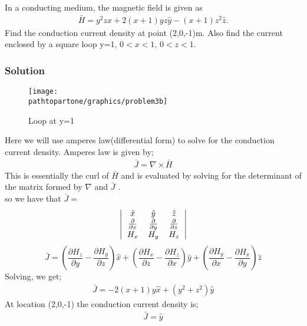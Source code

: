 \begin{exmp}
In a conducting medium, the magnetic field is given as
\begin{align*}
\bar{H}=y^{2}z\hat{x}+2(x+1)yz\hat{y}-(x+1)z^{2}\hat{z}.
\end{align*}
Find the conduction current density at point (2,0,-1)m. Also find the current enclosed by a square loop y=1, $0<x<1$, $0<z<1$.
\subsubsection*{Solution}
\begin{figure}[h]
\centering
\texttt{[image: \\pathtopartone/graphics/problem3b]}
\caption{Loop at y=1}
\end{figure} 

Here we will use amperes law(differential form) to solve for the conduction current density. Amperes law is given by;
\begin{align*}
\bar{J}=\nabla\times\bar{H}
\end{align*}
This is essentially the curl of $\bar{H}$ and is evaluated by solving for the determinant of the matrix formed by $\nabla$ and $\bar{J}$ .\\
so we have that $\bar{J} =$
\[
\left|
\begin{tabular}{c c c}
$\hat{x}$ & $\hat{y}$ & $\hat{z}$\\
$\frac{\partial}{\partial x}$ & $\frac{\partial}{\partial y}$ & $\frac{\partial}{\partial z}$\\
$H_{x}$ & $H_{y}$ & $H_{z}$
\end{tabular}
\right|
\]
\begin{dmath*}
\bar{J}= (\frac{\partial H_{z}}{\partial y}-\frac{\partial H_{y}}{\partial z})\hat{x}+ (\frac{\partial H_{x}}{\partial z}-\frac{\partial H_{z}}{\partial x})\hat{y}+ (\frac{\partial H_{y}}{\partial x}-\frac{\partial H_{x}}{\partial y})\hat{z}
\end{dmath*}
Solving, we get;
\begin{align*}
\bar{J}=-2(x+1)y\hat{x}+(y^{2}+z^{2})\hat{y}
\end{align*}
At location (2,0,-1) the conduction current density is;
\begin{align*}
\bar{J}=\hat{y}
\end{align*}


\end{exmp}
